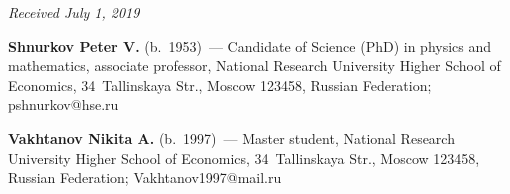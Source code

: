 
\hfill{\small\textit{Received July 1, 2019}}


     

\Contr

\noindent
\textbf{Shnurkov Peter V.} (b.\ 1953)~--- Candidate of Science (PhD) in physics and 
mathematics, associate professor, National Research University Higher School of Economics, 
34~Tallinskaya Str., Moscow 123458, Russian Federation; \mbox{pshnurkov@hse.ru}

\vspace*{3pt}

\noindent
\textbf{Vakhtanov Nikita A.} (b.\ 1997)~--- Master student, National Research 
University Higher School of Economics, 34~Tallinskaya Str., Moscow 123458, 
Russian Federation; \mbox{Vakhtanov1997@mail.ru}
\label{end\stat}

\renewcommand{\bibname}{\protect\rm Литература}  
      